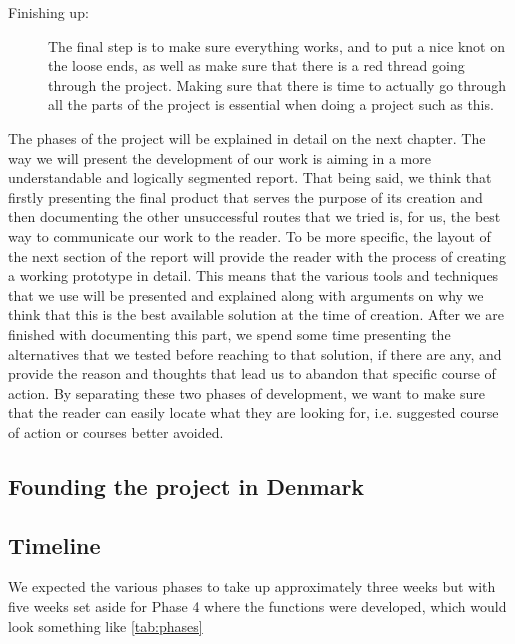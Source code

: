 \begin{description}
  \item[Finishing up:]The final step is to make sure everything works, and to put a nice knot on the loose ends, as well as make sure that there is a red thread going through the project. Making sure that there is time to actually go through all the parts of the project is essential when doing a project such as this. 


\end{description}

The phases of the project will be explained in detail on the next chapter. The way we will present the development of our work is aiming in a more understandable and logically segmented report. That being said, we think that firstly presenting the final product that serves the purpose of its creation and then documenting the other unsuccessful routes that we tried is, for us, the best way to communicate our work to the reader. To be more specific, the layout of the next section of the report will provide the reader with the process of creating a working prototype in detail. This means that the various tools and techniques that we use will be presented and explained along with arguments on why we think that this is the best available solution at the time of creation. After we are finished with documenting this part, we spend some time presenting the alternatives that we tested before reaching to that solution, if there are any, and provide the reason and thoughts that lead us to abandon that specific course of action. By separating these two phases of development, we want to make sure that the reader can easily locate what they are looking for, i.e. suggested course of action or courses better avoided. 

\subsection{Founding the project in Denmark}

\subsection{Timeline}
We expected the various phases to take up approximately three weeks but with five weeks set aside for Phase 4 where the functions were developed, which would look something like \autoref{tab:phases}\\

